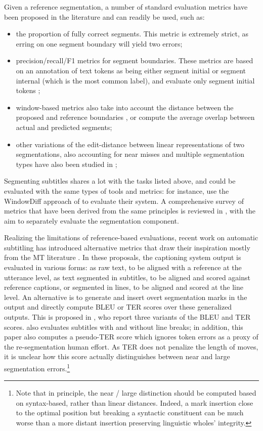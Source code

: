 \documentclass{article}
\begin{document}
Given a reference segmentation, a number of standard evaluation metrics have been proposed in the literature and can readily be used, such as:
\begin{itemize}
\item the proportion of fully correct segments. This metric is extremely strict, as erring on one segment boundary will yield two errors;
\item precision/recall/F1 metrics for segment boundaries. These metrics are based on an annotation of text tokens as being either segment initial or segment internal (which is the most common label), and evaluate only segment initial tokens \cite{Goldwater09bayesian};
\item window-based metrics also take into account the distance between the proposed and reference boundaries \cite{Beeferman99statistical,Pevzner02critique}, or compute the average overlap between actual and predicted segments;
\item other variations of the edit-distance between linear representations of two segmentations, also accounting for near misses and multiple segmentation types have also been studied in \cite{Fournier12segmentation,Fournier13evaluating,Martinez-Hinarejos15unsegmented};
\end{itemize}

Segmenting subtitles shares a lot with the tasks listed above, and could be evaluated with the same types of tools and metrics: for instance, \cite{Scaiano10automatic} use the WindowDiff approach of \cite{Pevzner02critique} to evaluate their system. A comprehensive survey of metrics that have been derived from the same principles is reviewed in \cite{Alvarez17improving}, with the aim to separately evaluate the segmentation component.

Realizing the limitations of reference-based evaluations, recent work on automatic subtitling has introduced alternative metrics that draw their inspiration mostly from the MT literature \cite{Matusov19customizing,Karakanta20is42}. In these proposals, the captioning system output is evaluated in various forms: as raw text, to be aligned with a reference at the utterance level, as text segmented in subtitles, to be aligned and scored against reference captions, or segmented in lines, to be aligned and scored at the line level. An alternative is to generate and insert overt segmentation marks in the output and directly compute BLEU or TER scores over these generalized outputs. This is proposed in \cite{Matusov19customizing}, who report three variants of the BLEU and TER scores. \cite{Karakanta20is42} also evaluates subtitles with and without line breaks; in addition, this paper also computes a pseudo-TER score which ignores token errors as a proxy of the re-segmentation human effort. As TER does not penalize the length of moves, it is unclear how this score actually distinguishes between near and large segmentation errors.\footnote{Note that in principle, the near / large distinction should be computed based on syntax-based, rather than linear distances. Indeed, a mark insertion close to the optimal position but breaking a syntactic constituent can be much worse than a more distant insertion preserving linguistic wholes' integrity.}
\end{document}

